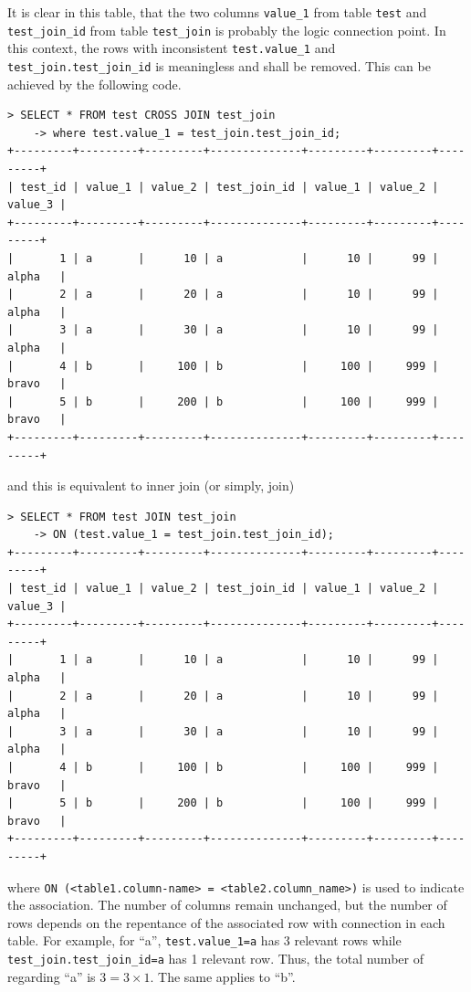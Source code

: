 It is clear in this table, that the two columns \verb|value_1| from table \verb|test| and \verb|test_join_id| from table \verb|test_join| is probably the logic connection point. In this context, the rows with inconsistent \verb|test.value_1| and \verb|test_join.test_join_id| is meaningless and shall be removed. This can be achieved by the following code.
\begin{lstlisting}
> SELECT * FROM test CROSS JOIN test_join
    -> where test.value_1 = test_join.test_join_id;
+---------+---------+---------+--------------+---------+---------+---------+
| test_id | value_1 | value_2 | test_join_id | value_1 | value_2 | value_3 |
+---------+---------+---------+--------------+---------+---------+---------+
|       1 | a       |      10 | a            |      10 |      99 | alpha   |
|       2 | a       |      20 | a            |      10 |      99 | alpha   |
|       3 | a       |      30 | a            |      10 |      99 | alpha   |
|       4 | b       |     100 | b            |     100 |     999 | bravo   |
|       5 | b       |     200 | b            |     100 |     999 | bravo   |
+---------+---------+---------+--------------+---------+---------+---------+
\end{lstlisting}
and this is equivalent to inner join (or simply, join)
\begin{lstlisting}
> SELECT * FROM test JOIN test_join
    -> ON (test.value_1 = test_join.test_join_id);
+---------+---------+---------+--------------+---------+---------+---------+
| test_id | value_1 | value_2 | test_join_id | value_1 | value_2 | value_3 |
+---------+---------+---------+--------------+---------+---------+---------+
|       1 | a       |      10 | a            |      10 |      99 | alpha   |
|       2 | a       |      20 | a            |      10 |      99 | alpha   |
|       3 | a       |      30 | a            |      10 |      99 | alpha   |
|       4 | b       |     100 | b            |     100 |     999 | bravo   |
|       5 | b       |     200 | b            |     100 |     999 | bravo   |
+---------+---------+---------+--------------+---------+---------+---------+
\end{lstlisting}
where \verb|ON (<table1.column-name> = <table2.column_name>)| is used to indicate the association. The number of columns remain unchanged, but the number of rows depends on the repentance of the associated row with connection in each table. For example, for ``a'', \verb|test.value_1=a| has 3 relevant rows while \verb|test_join.test_join_id=a| has 1 relevant row. Thus, the total number of regarding ``a'' is $3=3\times 1$. The same applies to ``b''.

